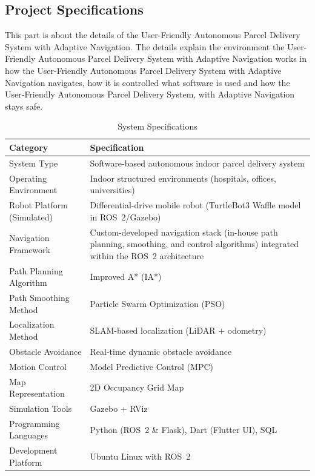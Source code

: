 \subsection{Project Specifications}
This part is about the details of the User-Friendly Autonomous Parcel Delivery System with Adaptive Navigation.
The details explain the environment the User-Friendly Autonomous Parcel Delivery System with Adaptive Navigation works in how the User-Friendly Autonomous Parcel Delivery System with Adaptive Navigation navigates, how it is controlled what software is used and how the User-Friendly Autonomous Parcel Delivery System, with Adaptive Navigation stays safe.
\begin{table}[H]
	\centering
	\caption{System Specifications}
	\label{tab:system_specs}
	\begin{tabular}{|p{5cm}|p{9cm}|}
		\hline
		\textbf{Category} & \textbf{Specification} \\
		\hline
		System Type & Software-based autonomous indoor parcel delivery system \\
		\hline
		Operating Environment & Indoor structured environments (hospitals, offices, universities) \\
		\hline
		Robot Platform (Simulated) & Differential-drive mobile robot (TurtleBot3 Waffle model in ROS~2/Gazebo) \\
		\hline
		Navigation Framework & Custom-developed navigation stack (in-house path planning, smoothing, and control algorithms) integrated within the ROS~2 architecture \\
		\hline
		Path Planning Algorithm & Improved A* (IA*) \\
		\hline
		Path Smoothing Method & Particle Swarm Optimization (PSO) \\
		\hline
		Localization Method & SLAM-based localization (LiDAR + odometry) \\
		\hline
		Obstacle Avoidance & Real-time dynamic obstacle avoidance \\
		\hline
		Motion Control & Model Predictive Control (MPC) \\
		\hline
		Map Representation & 2D Occupancy Grid Map \\
		\hline
		Simulation Tools & Gazebo + RViz \\
		\hline
		Programming Languages & Python (ROS~2 \& Flask), Dart (Flutter UI), SQL \\
		\hline
		Development Platform & Ubuntu Linux with ROS~2 \\
		\hline
	\end{tabular}
\end{table}
